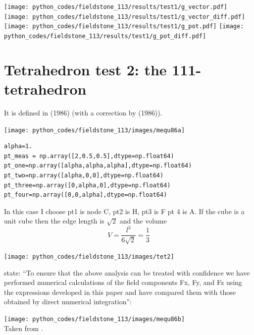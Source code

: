\begin{center}
\texttt{[image: python\_codes/fieldstone\_113/results/test1/g\_vector.pdf]}
\texttt{[image: python\_codes/fieldstone\_113/results/test1/g\_vector\_diff.pdf]}\\
\texttt{[image: python\_codes/fieldstone\_113/results/test1/g\_pot.pdf]}
\texttt{[image: python\_codes/fieldstone\_113/results/test1/g\_pot\_diff.pdf]}
\end{center}

\section*{Tetrahedron test 2: the 111-tetrahedron}

It is defined in \textcite{mequ86} (1986) (with a correction by \textcite{camq86} (1986)).

\begin{center}
\texttt{[image: python\_codes/fieldstone\_113/images/mequ86a]}
\end{center}

\begin{lstlisting}
alpha=1.
pt_meas = np.array([2,0.5,0.5],dtype=np.float64)
pt_one=np.array([alpha,alpha,alpha],dtype=np.float64)
pt_two=np.array([alpha,0,0],dtype=np.float64)
pt_three=np.array([0,alpha,0],dtype=np.float64)
pt_four=np.array([0,0,alpha],dtype=np.float64)
\end{lstlisting}


In this case I choose pt1 is node C, pt2 is H, pt3 is F pt 4 is A.
If the cube is a unit cube then the edge length is $\sqrt{2}$ and the volume
\[
V=\frac{l^3}{6\sqrt{2}} = \frac13
\]

\begin{center}
\texttt{[image: python\_codes/fieldstone\_113/images/tet2]}
\end{center}

\textcite{mequ86} state: ``To ensure that the above analysis can be treated
with confidence we have performed numerical calculations of the field components Fx, Fy, and 
Fz using the expressions developed in this paper and
have compared them with those obtained by direct numerical integration'':
\begin{center}
\texttt{[image: python\_codes/fieldstone\_113/images/mequ86b]}\\
{\captionfont Taken from \textcite{mequ86}.}
\end{center}

